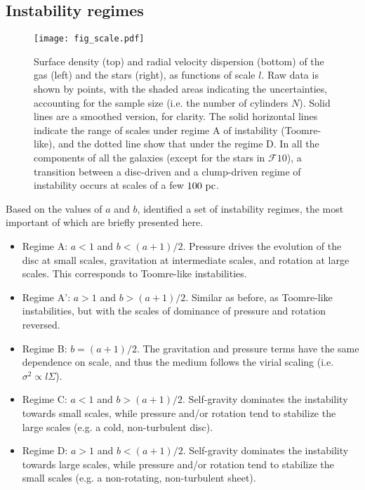 \documentclass[useAMS,usenatbib]{mnras}
\newcommand{\gs}{\ensuremath{\mathcal{F}10}\xspace}
\begin{document}
\subsection{Instability regimes}
\label{sec:ab}

\begin{figure*}
\centering
\texttt{[image: fig\_scale.pdf]}
\caption{Surface density (top) and radial velocity dispersion (bottom) of the gas (left) and the stars (right), as functions of scale $l$. Raw data is shown by points, with the shaded areas indicating the uncertainties, accounting for the sample size (i.e. the number of cylinders $N$). Solid lines are a smoothed version, for clarity. The solid horizontal lines indicate the range of scales under regime A of instability (Toomre-like), and the dotted line show that under the regime D. In all the components of all the galaxies (except for the stars in \gs), a transition between a disc-driven and a clump-driven regime of instability occurs at scales of a few $100 \mathrm{~pc}$.}
\label{fig:insta}
\end{figure*}

Based on the values of $a$ and $b$, \citet[see also \citealt{Romeo2014, Agertz2015b}]{Romeo2010} identified a set of instability regimes, the most important of which are briefly presented here.
\begin{itemize}
\item Regime A: $a < 1$ and $b < (a+1)/2$. Pressure drives the evolution of the disc at small scales, gravitation at intermediate scales, and rotation at large scales. This corresponds to Toomre-like instabilities.
\item Regime A': $a > 1$ and $b > (a+1)/2$. Similar as before, as Toomre-like instabilities, but with the scales of dominance of pressure and rotation reversed.
\item Regime B: $b = (a+1)/2$. The gravitation and pressure terms have the same dependence on scale, and thus the medium follows the virial scaling (i.e. $\sigma^2 \propto l \Sigma$).
\item Regime C: $a < 1$ and $b > (a+1)/2$. Self-gravity dominates the instability towards small scales, while pressure and/or rotation tend to stabilize the large scales (e.g. a cold, non-turbulent disc).
\item Regime D: $a > 1$ and $b < (a+1)/2$. Self-gravity dominates the instability towards large scales, while pressure and/or rotation tend to stabilize the small scales (e.g. a non-rotating, non-turbulent sheet). 
\end{itemize}
\end{document}
